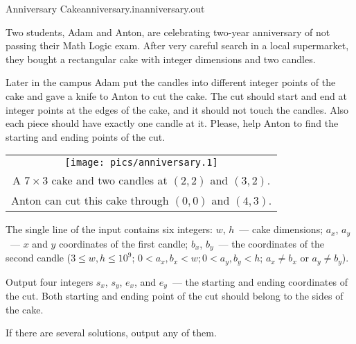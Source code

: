 \begin{problem}{Anniversary Cake}{anniversary.in}{anniversary.out}{\timeLimit}


Two students, Adam and Anton, are celebrating two-year anniversary of not passing
their Math Logic exam. After very careful search in a local supermarket,
they bought a rectangular cake with integer dimensions and two candles.

Later in the campus Adam put the candles into different integer points of the cake
and gave a knife to Anton to cut the cake.
The cut should start and end at integer points at the edges of the cake, and
it should not touch the candles. 
Also each piece should have exactly one candle at it.
Please, help Anton to find the starting and ending points of the cut.

\begin{center}
\begin{tabular}[c]{c}
  \texttt{[image: pics/anniversary.1]} \\
  A $7 \times 3$ cake and two candles at $(2, 2)$ and $(3, 2)$. \\
  Anton can cut this cake through $(0, 0)$ and $(4, 3)$.
\end{tabular}
\end{center}

\InputFile

The single line of the input contains six integers: 
    $w$, $h$~--- cake dimensions;
    $a_x$, $a_y$~--- $x$ and $y$ coordinates of the first candle;
    $b_x$, $b_y$~--- the coordinates of the second candle
($3 \le w, h \le 10^9$; $0 < a_x, b_x < w; 0 < a_y, b_y < h$; $a_x \ne b_x$ or $a_y \ne b_y$).

\OutputFile

Output four integers $s_x$, $s_y$, $e_x$, and $e_y$~---
the starting and ending coordinates of the cut.
Both starting and ending point of the cut should belong to the sides of the cake.

If there are several solutions, output any of them.

\Example

\begin{example}
%
\end{example}

\end{problem}
